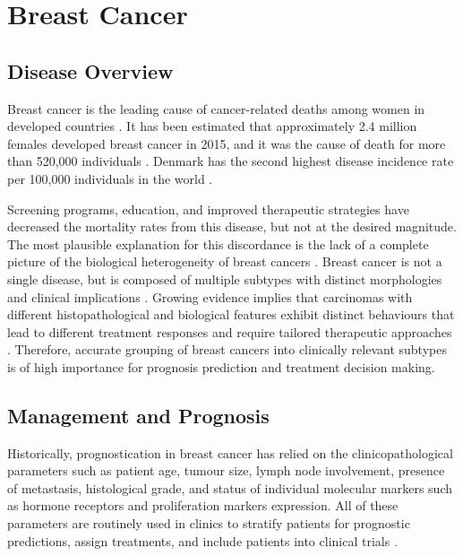 


\section{Breast Cancer}

    \subsection{Disease Overview}
   
    Breast cancer is the leading cause of cancer-related deaths among women in developed countries \cite{ferlay2015cancer}. It has been estimated that approximately 2.4 million females developed breast cancer in 2015, and it was the cause of death for more than 520,000 individuals \cite{Fitzmaurice2017Global2015}.  Denmark has the second highest disease incidence rate per 100,000 individuals in the world \cite{2015BreastInternational}. 
    
    Screening programs, education, and improved therapeutic strategies have decreased the mortality rates from this disease, but not at the desired magnitude. The most plausible explanation for this discordance is the lack of a complete picture of the biological heterogeneity of breast cancers \cite{Vidal2017}.
    Breast cancer is not a single disease, but is composed of multiple subtypes with distinct morphologies and clinical implications \cite{Dai2015}. Growing evidence implies that carcinomas with different histopathological and biological features exhibit distinct behaviours that lead to different treatment responses and require tailored therapeutic approaches \cite{Blows2010}. Therefore, accurate grouping of breast cancers into clinically relevant subtypes is of high importance for prognosis prediction and treatment decision making.

    \subsection{Management and Prognosis}
    
    Historically, prognostication in breast cancer has relied on the clinicopathological parameters such as patient age, tumour size, lymph node involvement, presence of metastasis, histological grade, and status of individual molecular markers such as hormone receptors and proliferation markers expression. All of these parameters are routinely used in clinics to stratify patients for prognostic predictions, assign treatments, and include patients into clinical trials \cite{Vidal2017}.

